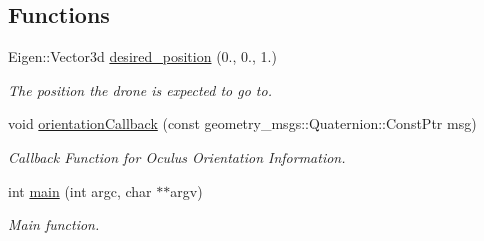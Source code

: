 \subsection*{Functions}
\begin{DoxyCompactItemize}
\item 
Eigen\+::\+Vector3d \hyperlink{oculus-control-alternative_8cpp_a608d9948c063034b7605598daaeccc3e}{desired\+\_\+position} (0., 0., 1.)
\begin{DoxyCompactList}\small\item\em The position the drone is expected to go to. \end{DoxyCompactList}\item 
void \hyperlink{oculus-control-alternative_8cpp_a570d60ef77ebe021853fd13c864ab969}{orientation\+Callback} (const geometry\+\_\+msgs\+::\+Quaternion\+::\+Const\+Ptr msg)
\begin{DoxyCompactList}\small\item\em Callback Function for Oculus Orientation Information. \end{DoxyCompactList}\item 
int \hyperlink{oculus-control-alternative_8cpp_a3c04138a5bfe5d72780bb7e82a18e627}{main} (int argc, char $\ast$$\ast$argv)
\begin{DoxyCompactList}\small\item\em Main function. \end{DoxyCompactList}\end{DoxyCompactItemize}
